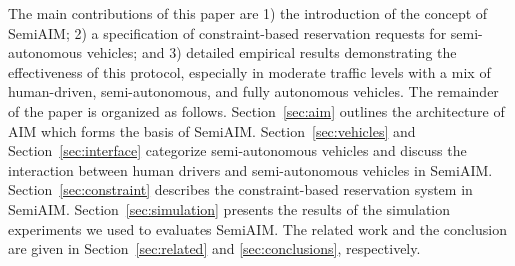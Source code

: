 The main contributions of this paper are 1) the introduction of the
concept of SemiAIM; 2) a specification of constraint-based reservation
requests for semi-autonomous vehicles; and 3) detailed empirical
results demonstrating the effectiveness of this protocol, especially
in moderate traffic levels with a mix of human-driven,
semi-autonomous, and fully autonomous vehicles.  The remainder of the
paper is organized as follows.  Section~\ref{sec:aim} outlines the
architecture of AIM which forms the basis of SemiAIM.
Section~\ref{sec:vehicles} and Section~\ref{sec:interface} categorize
semi-autonomous vehicles and discuss the interaction between human
drivers and semi-autonomous vehicles in SemiAIM.
Section~\ref{sec:constraint} describes the constraint-based
reservation system in SemiAIM.  Section~\ref{sec:simulation} presents
the results of the simulation experiments we used to evaluates
SemiAIM.  The related work and the conclusion are given in
Section~\ref{sec:related} and \ref{sec:conclusions}, respectively.







